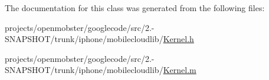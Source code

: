 \-The documentation for this class was generated from the following files\-:\begin{DoxyCompactItemize}
\item 
projects/openmobster/googlecode/src/2.-\/\-S\-N\-A\-P\-S\-H\-O\-T/trunk/iphone/mobilecloudlib/\hyperlink{_kernel_8h}{\-Kernel.\-h}\item 
projects/openmobster/googlecode/src/2.-\/\-S\-N\-A\-P\-S\-H\-O\-T/trunk/iphone/mobilecloudlib/\hyperlink{_kernel_8m}{\-Kernel.\-m}\end{DoxyCompactItemize}
